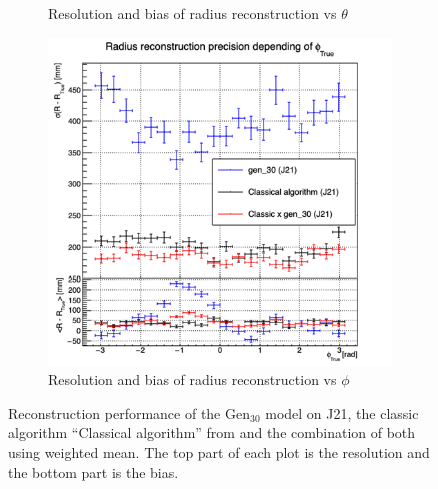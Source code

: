 \documentclass[../main.tex]{subfiles}
\begin{document}
\begin{figure}[ht]
\begin{subfigure}[t]{0.32\linewidth}
    \caption{Resolution and bias of radius reconstruction vs $\theta$}
    \label{fig:jcnn:vic_cnn:multi_vic_cnn_Cx30_MSBvTTC}
  \end{subfigure}
  \begin{subfigure}[t]{0.32\linewidth}
    \centering
    \includegraphics[width=\linewidth]{images/jcnn/vic_cnn/multi_vic_cnn_Cx30_MSBvPTC.png}
    \caption{Resolution and bias of radius reconstruction vs $\phi$}
    \label{fig:jcnn:vic_cnn:multi_vic_cnn_Cx30_MSBvPTC}
  \end{subfigure}
  \caption{Reconstruction performance of the $\mathrm{Gen}_{30}$ model on J21, the classic algorithm ``Classical algorithm'' from \cite{lebrin_towards_2022} and the combination of both using weighted mean. The top part of each plot is the resolution and the bottom part is the bias.}

  \label{fig:jcnn:vic_cnn:Cx30}
\end{figure}
\end{document}
